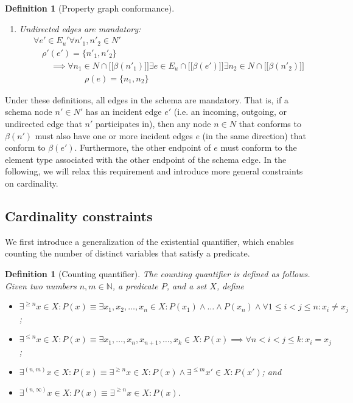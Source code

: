 \documentclass[a4paper]{article}
\newtheorem{definition}[theorem]{Definition}
\newcommand{\N}{\mathbb{N}}
\newcommand{\lsem}{\ensuremath{[\![}}
\newcommand{\rsem}{\ensuremath{]\!]}}
\newcommand{\sem}[1]{\ensuremath{\lsem #1 \rsem}}
\begin{document}
\begin{definition}[Property graph conformance]
\begin{enumerate}
    \item Undirected edges are mandatory:
    \begin{align*}
      &\forall e' \in E_u' \forall n'_1, n'_2 \in N'\\
      &\quad\rho'(e') = \{n'_1, n'_2\}\\
      &\quad\quad\implies {} \forall n_1 \in N \cap \sem{\beta(n'_1)} \exists e \in E_u \cap \sem{\beta(e')} \exists n_2 \in N \cap \sem{\beta(n'_2)}\\
      &\quad\quad\quad\quad\quad\quad\rho(e) = \{n_1, n_2\}
    \end{align*}
  \end{enumerate}
\end{definition}

Under these definitions, all edges in the schema are mandatory. That is, if a schema node $n' \in N'$ has an incident edge $e'$ (i.e. an incoming, outgoing, or undirected edge that $n'$ participates in), then any node $n \in N$ that conforms to $\beta(n')$ must also have one or more incident edges $e$ (in the same direction) that conform to $\beta(e')$. Furthermore, the other endpoint of $e$ must conform to the element type associated with the other endpoint of the schema edge. In the following, we will relax this requirement and introduce more general constraints on cardinality.

\subsection{Cardinality constraints}

We first introduce a generalization of the existential quantifier, which enables counting the number of distinct variables that satisfy a predicate.

\begin{definition}[Counting quantifier]
  The \emph{counting quantifier} is defined as follows. Given two numbers $n, m \in \N$, a predicate $P$, and a set $X$, define
  \begin{itemize}
    \item $\exists^{\geq n} x \in X : P(x) \equiv \exists x_1, x_2, \ldots, x_n \in X : P(x_1) \wedge \ldots \wedge P(x_n) \wedge \forall 1 \leq i < j \leq n : x_i \neq x_j$;
    \item $\exists^{\leq n} x \in X : P(x) \equiv \exists x_1, \ldots, x_n, x_{n+1}, \ldots, x_k \in X : P(x) \implies \forall n < i < j \leq k : x_i = x_j$;
    \item $\exists^{(n, m)} x \in X : P(x) \equiv \exists^{\geq n} x \in X : P(x) \wedge \exists^{\leq m} x' \in X : P(x')$; and
    \item $\exists^{(n, \infty)} x \in X : P(x) \equiv \exists^{\geq n} x \in X : P(x)$.
  \end{itemize}
\end{definition}
\end{document}
